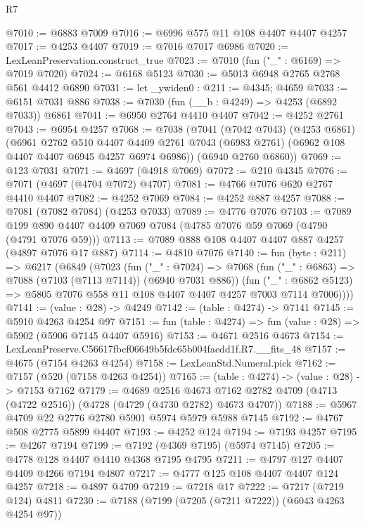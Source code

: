 \begin{lexlean}{R7}
\begin{coremodule}
@7010 := @6883 @7009
@7016 := @6996 @575 @11 @108 @4407 @4407 @4257
@7017 := @4253 @4407
@7019 := @7016 @7017 @6986
@7020 := LexLeanPreservation.construct_true
@7023 := @7010 (fun ("_" : @6169) => @7019 @7020)
@7024 := @6168 @5123
@7030 := @5013 @6948 @2765 @2768 @561 @4412 @6890
@7031 := let _ywiden0 : @211 := @4345; @4659
@7033 := @6151 @7031 @886
@7038 := @7030 (fun (__b : @4249) => @4253 (@6892 @7033)) @6861
@7041 := @6950 @2764 @4410 @4407
@7042 := @4252 @2761
@7043 := @6954 @4257
@7068 := @7038
    (@7041
      (@7042 @7043)
      (@4253 @6861)
      (@6961
        @2762
        @510
        @4407
        @4409
        @2761
        @7043
        (@6983 @2761)
        (@6962 @108 @4407 @4407 @6945 @4257 @6974 @6986))
      (@6940 @2760 @6860))
@7069 := @123 @7031
@7071 := @4697 (@4918 @7069)
@7072 := @210 @4345
@7076 := @7071 (@4697 (@4704 @7072) @4707)
@7081 := @4766 @7076 @620 @2767 @4410 @4407
@7082 := @4252 @7069
@7084 := @4252 @887 @4257
@7088 := @7081 (@7082 @7084) (@4253 @7033)
@7089 := @4776 @7076
@7103 := @7089 @199 @890 @4407 @4409 @7069 @7084 (@4785 @7076 @59 @7069 (@4790 (@4791 @7076 @59)))
@7113 := @7089 @888 @108 @4407 @4407 @887 @4257 (@4897 @7076 @17 @887)
@7114 := @4810 @7076
@7140 := fun (byte : @211) =>
  @6217
    (@6849
      (@7023
        (fun ("_" : @7024) =>
        @7068
          (fun ("_" : @6863) => @7088 (@7103 (@7113 @7114)) (@6940 @7031 @886))
          (fun ("_" : @6862 @5123) =>
          @5805 @7076 @558 @11 @108 @4407 @4407 @4257 @7003 @7114 @7006))))
@7141 := (value : @28) -> @4249
@7142 := (table : @4274) -> @7141
@7145 := @5910 @4263 @4254 @97
@7151 := fun (table : @4274) => fun (value : @28) => @5902 (@5906 @7145 @4407 @5916)
@7153 := @4671 @2516 @4673
@7154 := LexLeanPreserve.C56617fbcf06649b5fdc65b004faedd1f.R7.__fits_48
@7157 := @4675 (@7154 @4263 @4254)
@7158 := LexLeanStd.Numeral.pick
@7162 := @7157 (@520 (@7158 @4263 @4254))
@7165 := (table : @4274) -> (value : @28) -> @7153 @7162
@7179 := @4689
    @2516
    @4673
    @7162
    @2782
    @4709
    (@4713 (@4722 @2516))
    (@4728 (@4729 (@4730 @2782) @4673 @4707))
@7188 := @5967 @4709 @22 @2776 @2780 @5901 @5974 @5979 @5988 @7145
@7192 := @4767 @508 @2775 @5899 @4407
@7193 := @4252 @124
@7194 := @7193 @4257
@7195 := @4267 @7194
@7199 := @7192 (@4369 @7195) (@5974 @7145)
@7205 := @4778 @128 @4407 @4410 @4368 @7195 @4795
@7211 := @4797 @127 @4407 @4409 @4266 @7194 @4807
@7217 := @4777 @125 @108 @4407 @4407 @124 @4257
@7218 := @4897 @4709
@7219 := @7218 @17
@7222 := @7217 (@7219 @124) @4811
@7230 := @7188 (@7199 (@7205 (@7211 @7222)) (@6043 @4263 @4254 @97))

\end{coremodule}
\end{lexlean}
